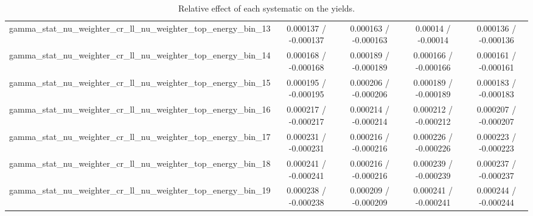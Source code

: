 \documentclass[10pt]{article}
\begin{document}
\begin{table}[htbp]
\begin{center}
\begin{tabular}{|c|c|c|c|c|}
  gamma_stat_nu_weighter_cr_ll_nu_weighter_top_energy_bin_13 & 0.000137 / -0.000137 & 0.000163 / -0.000163 & 0.00014 / -0.00014 & 0.000136 / -0.000136 \\ 
  gamma_stat_nu_weighter_cr_ll_nu_weighter_top_energy_bin_14 & 0.000168 / -0.000168 & 0.000189 / -0.000189 & 0.000166 / -0.000166 & 0.000161 / -0.000161 \\ 
  gamma_stat_nu_weighter_cr_ll_nu_weighter_top_energy_bin_15 & 0.000195 / -0.000195 & 0.000206 / -0.000206 & 0.000189 / -0.000189 & 0.000183 / -0.000183 \\ 
  gamma_stat_nu_weighter_cr_ll_nu_weighter_top_energy_bin_16 & 0.000217 / -0.000217 & 0.000214 / -0.000214 & 0.000212 / -0.000212 & 0.000207 / -0.000207 \\ 
  gamma_stat_nu_weighter_cr_ll_nu_weighter_top_energy_bin_17 & 0.000231 / -0.000231 & 0.000216 / -0.000216 & 0.000226 / -0.000226 & 0.000223 / -0.000223 \\ 
  gamma_stat_nu_weighter_cr_ll_nu_weighter_top_energy_bin_18 & 0.000241 / -0.000241 & 0.000216 / -0.000216 & 0.000239 / -0.000239 & 0.000237 / -0.000237 \\ 
  gamma_stat_nu_weighter_cr_ll_nu_weighter_top_energy_bin_19 & 0.000238 / -0.000238 & 0.000209 / -0.000209 & 0.000241 / -0.000241 & 0.000244 / -0.000244 \\ 
\hline 
\end{tabular} 
\caption{Relative effect of each systematic on the yields.} 
\end{center} 
\end{table} 
\end{document}
